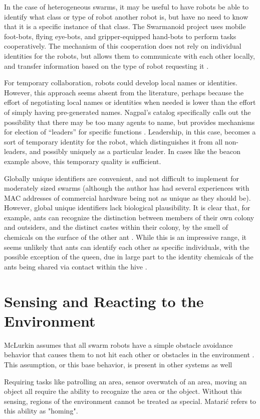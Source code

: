 \documentclass[]{article}
\begin{document}
In the case of heterogeneous swarms, it may be useful to have robots be able to identify what class or type of robot another robot is, but have no need to know that it is a specific instance of that class. The Swarmanoid project uses mobile foot-bots, flying eye-bots, and gripper-equipped hand-bots to perform tasks cooperatively. The mechanism of this cooperation does not rely on individual identities for the robots, but allows them to communicate with each other locally, and transfer information based on the type of robot requesting it \cite{ducatelle2011self}. 

For temporary collaboration, robots could develop local names or identities. 
However, this approach seems absent from the literature, perhaps because the effort of negotiating local names or identities when needed is lower than the effort of simply having pre-generated names. 
Nagpal's catalog specifically calls out the possibility that there may be too many agents to name, but provides mechanisms for election of ``leaders'' for specific functions \cite{nagpal2004catalog}. 
Leadership, in this case, becomes a sort of temporary identity for the robot, which distinguishes it from all non-leaders, and possibly uniquely as a particular leader. 
In cases like the beacon example above, this temporary quality is sufficient.  

Globally unique identifiers are convenient, and not difficult to implement for moderately sized swarms (although the author has had several experiences with MAC addresses of commercial hardware being not as unique as they should be).
However, global unique identifiers lack biological plausibility. 
It is clear that, for example, ants can recognize the distinction between members of their own colony and outsiders, and the distinct castes within their colony, by the smell of chemicals on the surface of the other ant \cite{sharma2015cuticular}. 
While this is an impressive range, it seems unlikely that ants can identify each other as specific individuals, with the possible exception of the queen, due in large part to the identity chemicals of the ants being shared via contact within the hive \cite{bos2012recognition}. 

\section {Sensing and Reacting to the Environment}

McLurkin assumes that all swarm robots have a simple obstacle avoidance behavior that causes them to not hit each other or obstacles in the environment \cite{mclurkin2004stupid}.
This assumption, or this base behavior, is present in other systems as well \cite{werger1999cooperation, mataric1995designing}

Requiring tasks like patrolling an area, sensor overwatch of an area, moving an object all require the ability to recognize the area or the object. Without this sensing, regions of the environment cannot be treated as special. 
Matari\'c refers to this ability as "homing"\cite{mataric1995designing}.



\end{document}
